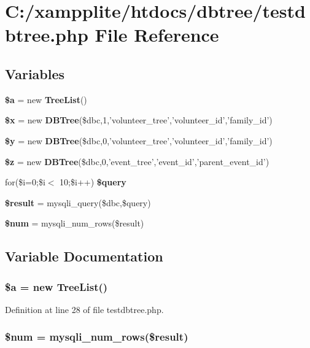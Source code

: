 \section{C:/xampplite/htdocs/dbtree/testdbtree.php File Reference}
\label{testdbtree_8php}
\subsection*{Variables}
\begin{DoxyCompactItemize}
\item 
{\bf \$a} = new {\bf TreeList}()
\item 
{\bf \$x} = new {\bf DBTree}(\$dbc,1,'volunteer\_\-tree','volunteer\_\-id','family\_\-id')
\item 
{\bf \$y} = new {\bf DBTree}(\$dbc,0,'volunteer\_\-tree','volunteer\_\-id','family\_\-id')
\item 
{\bf \$z} = new {\bf DBTree}(\$dbc,0,'event\_\-tree','event\_\-id','parent\_\-event\_\-id')
\item 
for(\$i=0;\$i$<$ 10;\$i++) {\bf \$query}
\item 
{\bf \$result} = mysqli\_\-query(\$dbc,\$query)
\item 
{\bf \$num} = mysqli\_\-num\_\-rows(\$result)
\end{DoxyCompactItemize}


\subsection{Variable Documentation}
\subsubsection[{\$a}]{\setlength{\rightskip}{0pt plus 5cm}\$a = new {\bf TreeList}()}\label{testdbtree_8php_acebf83966ef6d7e5645a6b62ba368f9f}


Definition at line 28 of file testdbtree.php.
\subsubsection[{\$num}]{\setlength{\rightskip}{0pt plus 5cm}\$num = mysqli\_\-num\_\-rows(\$result)}\label{testdbtree_8php_a606c9dff2aade84f01338c3c4cd8016b}


